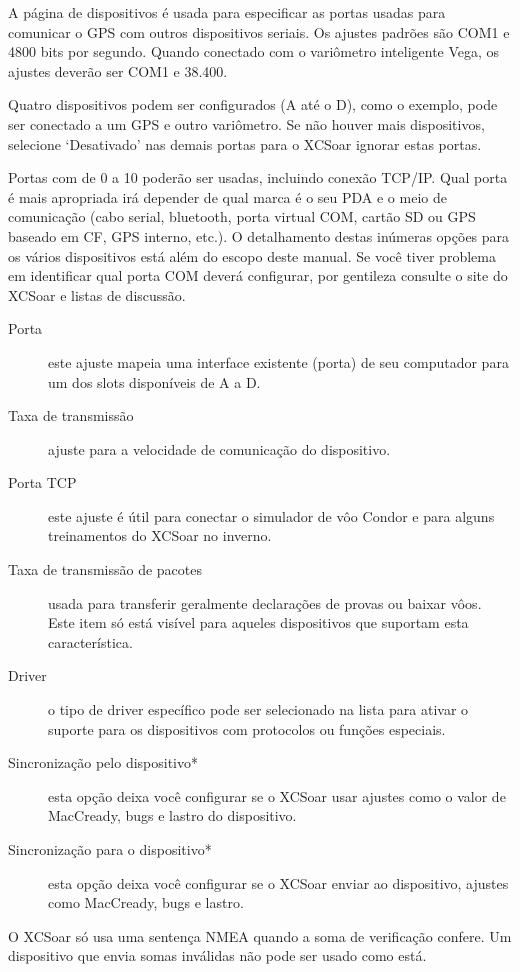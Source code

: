 A página de dispositivos é usada para especificar as portas usadas para 
comunicar o GPS com outros dispositivos seriais.  Os ajustes padrões são COM1 e 4800 bits por segundo.  Quando conectado com o variômetro inteligente Vega, os ajustes deverão ser COM1 e 38.400.

Quatro dispositivos podem ser configurados (A até o D), como o exemplo, pode ser conectado a um GPS e outro variômetro.  Se não houver mais dispositivos, selecione ‘Desativado’ nas demais portas para o XCSoar ignorar estas portas.


Portas com de 0 a 10 poderão ser usadas, incluindo conexão TCP/IP.   Qual porta é mais apropriada irá depender de qual marca é o seu PDA e o meio de comunicação (cabo serial, bluetooth, porta virtual COM, cartão SD ou GPS baseado em CF, GPS interno, etc.).  O detalhamento destas inúmeras opções para os vários dispositivos está além do escopo deste manual.  Se você tiver problema em identificar qual porta COM deverá configurar, por gentileza consulte o site do XCSoar e listas de discussão.  

\begin{description}
\item[Porta] este ajuste mapeia uma interface existente (porta) de seu computador para um dos slots disponíveis de A a D.
\item[Taxa de transmissão]  ajuste para a velocidade de comunicação do dispositivo.
\item[Porta TCP]  este ajuste é útil para conectar o simulador de vôo Condor e para alguns treinamentos do XCSoar no inverno.
\item[Taxa de transmissão de pacotes]  usada para transferir geralmente declarações de provas ou baixar vôos.  Este item só está visível para aqueles dispositivos que suportam esta característica.
\item[Driver] o tipo de driver específico pode ser selecionado na lista para ativar o suporte para os dispositivos com protocolos ou funções especiais.
\item[Sincronização pelo dispositivo*]  esta opção deixa você configurar se o XCSoar usar ajustes como o valor de MacCready, bugs e lastro do dispositivo.
\item[Sincronização para o dispositivo*]  esta opção deixa você configurar se o XCSoar enviar ao dispositivo, ajustes como MacCready, bugs e lastro.
\end{description}

O XCSoar só usa uma sentença NMEA quando a soma de verificação confere.
Um dispositivo que envia somas inválidas não pode ser usado como está.

